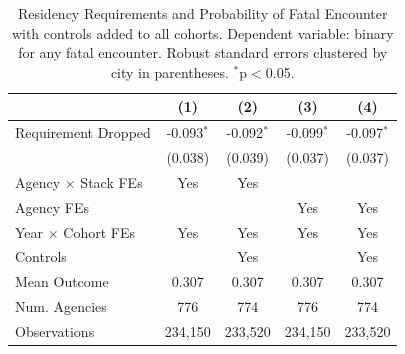 \begin{table}[!htb]\centering
\caption{Residency Requirements and Probability of Fatal Encounter with controls added to all cohorts. Dependent variable: binary for any fatal encounter. Robust standard errors clustered by city in
parentheses. $^{*}$p$<$0.05.}
\label{tab:fatal-full15-reg}
\begin{tabular}{lcccc}
\toprule
 & (1) & (2) & (3) & (4) \\
\midrule
Requirement Dropped & -0.093$^{*}$ & -0.092$^{*}$ & -0.099$^{*}$ & -0.097$^{*}$ \\
 & (0.038) & (0.039) & (0.037) & (0.037) \\
\midrule
Agency $\times$ Stack FEs & Yes & Yes &  &  \\
Agency FEs &  &  & Yes & Yes \\
Year $\times$ Cohort FEs & Yes & Yes & Yes & Yes \\
Controls &  & Yes &  & Yes \\
Mean Outcome & 0.307 & 0.307 & 0.307 & 0.307 \\
Num. Agencies & 776 & 774 & 776 & 774 \\
Observations & 234,150 & 233,520 & 234,150 & 233,520 \\
\bottomrule
\end{tabular}
\end{table}
